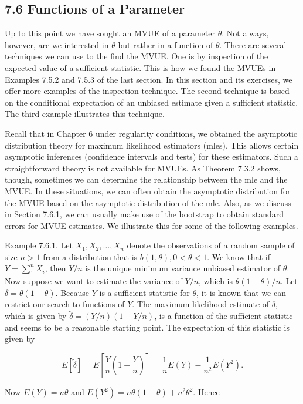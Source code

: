 \subsection*{7.6 Functions of a Parameter}
Up to this point we have sought an MVUE of a parameter $\theta$. Not always, however, are we interested in $\theta$ but rather in a function of $\theta$. There are several techniques we can use to the find the MVUE. One is by inspection of the expected value of a sufficient statistic. This is how we found the MVUEs in Examples 7.5.2 and 7.5.3 of the last section. In this section and its exercises, we offer more examples of the inspection technique. The second technique is based on the conditional expectation of an unbiased estimate given a sufficient statistic. The third example illustrates this technique.

Recall that in Chapter 6 under regularity conditions, we obtained the asymptotic distribution theory for maximum likelihood estimators (mles). This allows certain asymptotic inferences (confidence intervals and tests) for these estimators. Such a straightforward theory is not available for MVUEs. As Theorem 7.3.2 shows, though, sometimes we can determine the relationship between the mle and the MVUE. In these situations, we can often obtain the asymptotic distribution for the MVUE based on the asymptotic distribution of the mle. Also, as we discuss in Section 7.6.1, we can usually make use of the bootstrap to obtain standard errors for MVUE estimates. We illustrate this for some of the following examples.

Example 7.6.1. Let $X_{1}, X_{2}, \ldots, X_{n}$ denote the observations of a random sample of size $n>1$ from a distribution that is $b(1, \theta), 0<\theta<1$. We know that if $Y=\sum_{1}^{n} X_{i}$, then $Y / n$ is the unique minimum variance unbiased estimator of $\theta$. Now suppose we want to estimate the variance of $Y / n$, which is $\theta(1-\theta) / n$. Let $\delta=\theta(1-\theta)$. Because $Y$ is a sufficient statistic for $\theta$, it is known that we can restrict our search to functions of $Y$. The maximum likelihood estimate of $\delta$, which is given by $\tilde{\delta}=(Y / n)(1-Y / n)$, is a function of the sufficient statistic and seems to be a reasonable starting point. The expectation of this statistic is given by

$$
E[\tilde{\delta}]=E\left[\frac{Y}{n}\left(1-\frac{Y}{n}\right)\right]=\frac{1}{n} E(Y)-\frac{1}{n^{2}} E\left(Y^{2}\right) .
$$

Now $E(Y)=n \theta$ and $E\left(Y^{2}\right)=n \theta(1-\theta)+n^{2} \theta^{2}$. Hence

